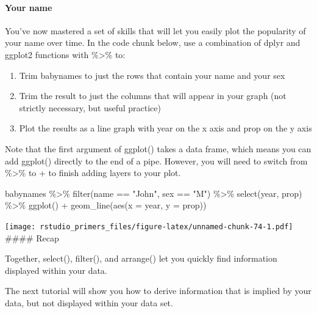 \documentclass[
]{article}
\newenvironment{Shaded}{\begin{snugshade}}{\end{snugshade}}
\newcommand{\AttributeTok}[1]{\textcolor[rgb]{0.77,0.63,0.00}{#1}}
\newcommand{\FunctionTok}[1]{\textcolor[rgb]{0.00,0.00,0.00}{#1}}
\newcommand{\NormalTok}[1]{#1}
\newcommand{\SpecialCharTok}[1]{\textcolor[rgb]{0.00,0.00,0.00}{#1}}
\newcommand{\StringTok}[1]{\textcolor[rgb]{0.31,0.60,0.02}{#1}}
\providecommand{\tightlist}{%
  \setlength{\itemsep}{0pt}\setlength{\parskip}{0pt}}
\begin{document}
\hypertarget{your-name-1}{%
\paragraph{Your name}\label{your-name-1}}

You've now mastered a set of skills that will let you easily plot the
popularity of your name over time. In the code chunk below, use a
combination of dplyr and ggplot2 functions with \%\textgreater\% to:

\begin{enumerate}
\def\labelenumi{\arabic{enumi}.}
\tightlist
\item
  Trim babynames to just the rows that contain your name and your sex
\item
  Trim the result to just the columns that will appear in your graph
  (not strictly necessary, but useful practice)
\item
  Plot the results as a line graph with year on the x axis and prop on
  the y axis
\end{enumerate}

Note that the first argument of ggplot() takes a data frame, which means
you can add ggplot() directly to the end of a pipe. However, you will
need to switch from \%\textgreater\% to + to finish adding layers to
your plot.

\begin{Shaded}
\begin{Highlighting}[]
\NormalTok{babynames }\SpecialCharTok{\%\textgreater{}\%} 
   \FunctionTok{filter}\NormalTok{(name }\SpecialCharTok{==} \StringTok{"John"}\NormalTok{, sex }\SpecialCharTok{==} \StringTok{"M"}\NormalTok{) }\SpecialCharTok{\%\textgreater{}\%}
   \FunctionTok{select}\NormalTok{(year, prop) }\SpecialCharTok{\%\textgreater{}\%}
   \FunctionTok{ggplot}\NormalTok{() }\SpecialCharTok{+}
      \FunctionTok{geom\_line}\NormalTok{(}\FunctionTok{aes}\NormalTok{(}\AttributeTok{x =}\NormalTok{ year, }\AttributeTok{y =}\NormalTok{ prop))}
\end{Highlighting}
\end{Shaded}

\texttt{[image: rstudio\_primers\_files/figure-latex/unnamed-chunk-74-1.pdf]}
\#\#\#\# Recap

Together, select(), filter(), and arrange() let you quickly find
information displayed within your data.

The next tutorial will show you how to derive information that is
implied by your data, but not displayed within your data set.
\end{document}
